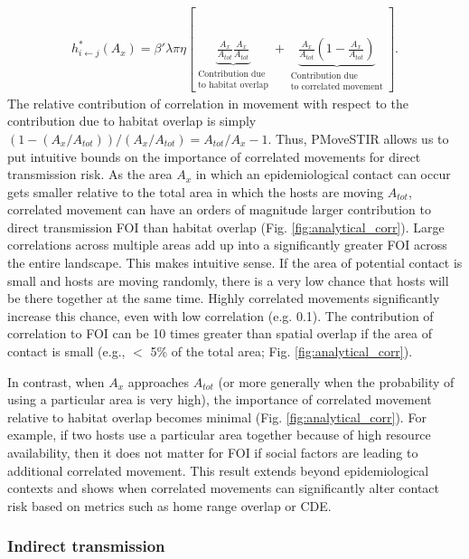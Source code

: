 \documentclass[letterpaper]{article}
\begin{document}
\begin{equation}
    \begin{aligned}
        h^*_{i \leftarrow j}(A_x) = \beta' \lambda \pi \eta \left[\underbrace{\frac{A_x}{A_{tot}}\frac{A_x}{A_{tot}}}_{\substack{\text{Contribution due} \\  \text{to habitat overlap}}} + \underbrace{\frac{A_x}{A_{tot}}(1 - \frac{A_x}{A_{tot}})}_{\substack{\text{Contribution due} \\ \text{to correlated movement}}} \right].
    \end{aligned}
    \label{eq:uniform_direct}
\end{equation}
The relative contribution of correlation in movement with respect to the contribution due to habitat overlap is simply $(1 - (A_x / A_{tot})) / (A_x / A_{tot})=A_{tot}/A_x-1$. 
Thus, PMoveSTIR allows us to put intuitive bounds on the importance of correlated movements for direct transmission risk. 
As the area $A_x$ in which an epidemiological contact can occur gets smaller relative to the total area in which the hosts are moving $A_{tot}$, correlated movement can have an orders of magnitude larger contribution to direct transmission FOI than habitat overlap (Fig. \ref{fig:analytical_corr}). Large correlations across multiple areas add up into a significantly greater FOI across the entire landscape. 
This makes intuitive sense. If the area of potential contact is small and hosts are moving randomly, there is a very low chance that hosts will be there together at the same time. Highly correlated movements significantly increase this chance, even with low correlation (e.g. 0.1). The contribution of correlation to FOI can be 10 times greater than spatial overlap if the area of contact is small (e.g., $<$ 5\% of the total area; Fig. \ref{fig:analytical_corr}).

In contrast, when $A_x$ approaches $A_{tot}$ (or more generally when the probability of using a particular area is very high), the importance of correlated movement relative to habitat overlap becomes minimal (Fig. \ref{fig:analytical_corr}). For example, if two hosts use a particular area together because of high resource availability, then it does not matter for FOI if social factors are leading to additional correlated movement. This result extends beyond epidemiological contexts and shows when correlated movements can significantly alter contact risk based on metrics such as home range overlap or CDE.

\subsubsection*{Indirect transmission}
\end{document}
